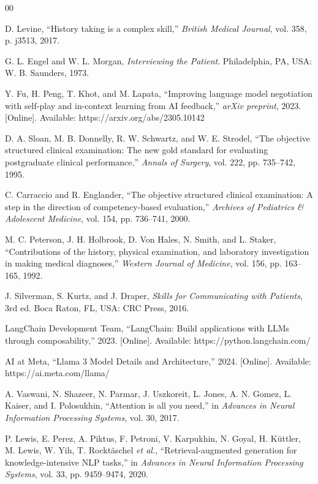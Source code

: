 \documentclass[12pt]{article}
\begin{document}
\newpage
\begin{thebibliography}{00}

D. Levine, ``History taking is a complex skill,'' \textit{British Medical Journal}, vol. 358, p. j3513, 2017.

G. L. Engel and W. L. Morgan, \textit{Interviewing the Patient}. Philadelphia, PA, USA: W. B. Saunders, 1973.

Y. Fu, H. Peng, T. Khot, and M. Lapata, ``Improving language model negotiation with self-play and in-context learning from AI feedback,'' \textit{arXiv preprint}, 2023. [Online]. Available: https://arxiv.org/abs/2305.10142

D. A. Sloan, M. B. Donnelly, R. W. Schwartz, and W. E. Strodel, ``The objective structured clinical examination: The new gold standard for evaluating postgraduate clinical performance,'' \textit{Annals of Surgery}, vol. 222, pp. 735--742, 1995.

C. Carraccio and R. Englander, ``The objective structured clinical examination: A step in the direction of competency-based evaluation,'' \textit{Archives of Pediatrics \& Adolescent Medicine}, vol. 154, pp. 736--741, 2000.

M. C. Peterson, J. H. Holbrook, D. Von Hales, N. Smith, and L. Staker, ``Contributions of the history, physical examination, and laboratory investigation in making medical diagnoses,'' \textit{Western Journal of Medicine}, vol. 156, pp. 163--165, 1992.

J. Silverman, S. Kurtz, and J. Draper, \textit{Skills for Communicating with Patients}, 3rd ed. Boca Raton, FL, USA: CRC Press, 2016.

LangChain Development Team, ``LangChain: Build applications with LLMs through composability,'' 2023. [Online]. Available: https://python.langchain.com/

AI at Meta, ``Llama 3 Model Details and Architecture,'' 2024. [Online]. Available: https://ai.meta.com/llama/

A. Vaswani, N. Shazeer, N. Parmar, J. Uszkoreit, L. Jones, A. N. Gomez, L. Kaiser, and I. Polosukhin, ``Attention is all you need,'' in \textit{Advances in Neural Information Processing Systems}, vol. 30, 2017.

P. Lewis, E. Perez, A. Piktus, F. Petroni, V. Karpukhin, N. Goyal, H. Küttler, M. Lewis, W. Yih, T. Rocktäschel \emph{et al.}, ``Retrieval-augmented generation for knowledge-intensive NLP tasks,'' in \textit{Advances in Neural Information Processing Systems}, vol. 33, pp. 9459--9474, 2020.


\end{thebibliography}
\end{document}
